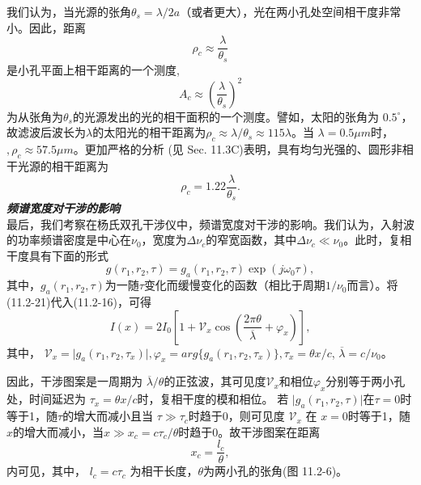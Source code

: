 \documentclass[UTF8]{ctexart}
\numberwithin{figure}{subsection}
\numberwithin{table}{subsection}
\newcommand\degree{^\circ}
\begin{document}
\par 我们认为，当光源的张角$ \theta_s = \lambda / 2a $（或者更大），光在两小孔处空间相干度非常小。因此，距离
\begin{equation}
\rho_c \approx \frac{\lambda}{\theta_s}
\end{equation}
是小孔平面上相干距离的一个测度,
\begin{equation}
A_c \approx (\frac{\lambda}{\theta_s})^2
\end{equation}
为从张角为$\theta_s$的光源发出的光的相干面积的一个测度。譬如，太阳的张角为 $0.5 \degree$，故滤波后波长为$\lambda$的太阳光的相干距离为$\rho_c \approx \lambda / \theta_s \approx 115\lambda$。当 $\lambda = 0.5 \mu m$时，$, \rho_c \approx 57.5 \mu m$。更加严格的分析 (见 Sec. 11.3C)表明，具有均匀光强的、圆形非相干光源的相干距离为
\begin{equation}
\rho_c = 1.22 \frac{\lambda}{\theta_s} .
\end{equation}
\bigbreak\noindent\textcolor{ksc}{\textbf{\textsl{频谱宽度对干涉的影响}}}\\
最后，我们考察在杨氏双孔干涉仪中，频谱宽度对干涉的影响。我们认为，入射波的功率频谱密度是中心在$\nu_0$，宽度为$\Delta \nu_c$的窄宽函数，其中$\Delta \nu_c \ll \nu_0$。此时，复相干度具有下面的形式
\begin{equation}
g(r_1, r_2, \tau) = g_a (r_1, r_2, \tau) \exp (j\omega_0 \tau),
\end{equation}
其中，$g_a (r_1, r_2, \tau)$为一随$\tau$变化而缓慢变化的函数（相比于周期$1 / \nu_0$而言）。将(11.2-21)代入(11.2-16)，可得
\begin{equation}
I(x) = 2I_0 [1 + \mathcal{V}_x \cos(\frac{2\pi \theta}{\overline{\lambda}} + \varphi_x)] ,
\end{equation}
其中， $\mathcal{V}_x = \lvert g_a (r_1, r_2, \tau_x) \rvert , \varphi_x = arg\{g_a (r_1, r_2, \tau_x)\} , \tau_x = \theta x / c$, $\overline{\lambda} = c / \nu_0$。
\par 因此，干涉图案是一周期为 $\overline{\lambda} / \theta$的正弦波，其可见度$\mathcal{V}_x$和相位$\varphi_x$分别等于两小孔处，时间延迟为 $\tau_x = \theta x / c$时，复相干度的模和相位。 若 $\lvert g_a(r_1, r_2, \tau) \rvert$在$\tau = 0$时等于1，随$\tau$的增大而减小且当 $\tau \gg \tau_c$时趋于0，则可见度 $\mathcal{V}_x $ 在 $x =0$时等于1，随$x$的增大而减小，当$x \gg x_c = c\tau_c / \theta$时趋于0。故干涉图案在距离 
\begin{equation}
x_c = \frac{l_c}{\theta} , 
\end{equation}
内可见，其中， $l_c = c\tau_c$ 为相干长度，$\theta$为两小孔的张角(图 11.2-6)。
\end{document}

